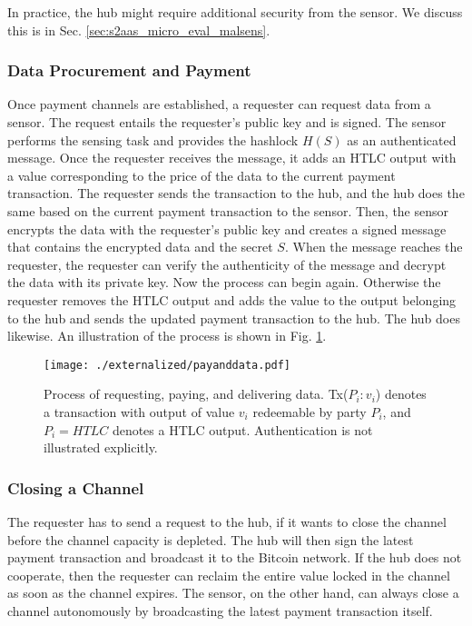 In practice, the hub might require additional security from the sensor. We discuss this is in Sec. \ref{sec:s2aas_micro_eval_malsens}.

\subsubsection{Data Procurement and Payment}

Once payment channels are established, a requester can request data from a sensor. The request entails the requester's public key and is signed.  
The sensor performs the sensing task and provides the hashlock $H(S)$ as an authenticated message. Once the requester receives the message, it adds an \ac{HTLC} output with a value corresponding to the price of the data to the current payment transaction. The requester sends the transaction to the hub, and the hub does the same based on the current payment transaction to the sensor. Then, the sensor encrypts the data with the requester's public key and creates a signed message that contains the encrypted data and the secret $S$. When the message reaches the requester, the requester can verify the authenticity of the message and decrypt the data with its private key. Now the process can begin again. Otherwise the requester removes the \ac{HTLC} output and adds the value to the output belonging to the hub and sends the updated payment transaction to the hub. The hub does likewise. An illustration of the process is shown in Fig. \ref{fig:payanddata}.

\begin{figure}
 \texttt{[image: ./externalized/payanddata.pdf]}
 \caption{Process of requesting, paying, and delivering data. Tx($P_i:v_i$) denotes a transaction with output of value $v_i$ redeemable by party $P_i$, and $P_i=HTLC$ denotes a HTLC output. Authentication is not illustrated explicitly.}
 \label{fig:payanddata}
 \end{figure}

 \subsubsection{Closing a Channel}

 The requester has to send a request to the hub, if it wants to close the channel before the channel capacity is depleted. The hub will then sign the latest payment transaction and broadcast it to the Bitcoin network. If the hub does not cooperate, then the requester can reclaim the entire value locked in the channel as soon as the channel expires.
 The sensor, on the other hand, can always close a channel autonomously by broadcasting the latest payment transaction itself. 

